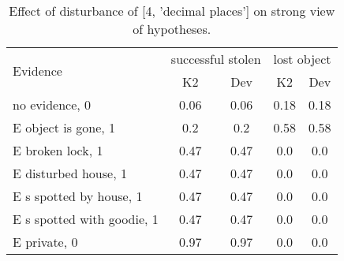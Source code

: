 \begin{table}\begin{tabular}{l|cc|cc}\toprule\multirow{2}{*}{Evidence} & \multicolumn{2}{c}{successful stolen}& \multicolumn{2}{c}{lost object}\\& {K2} & {Dev}& {K2} & {Dev}\\\midrule
no evidence, 0 & 0.06&0.06&0.18&0.18\\E object is gone, 1 & 0.2&0.2&0.58&0.58\\E broken lock, 1 & 0.47&0.47&0.0&0.0\\E disturbed house, 1 & 0.47&0.47&0.0&0.0\\E s spotted by house, 1 & 0.47&0.47&0.0&0.0\\E s spotted with goodie, 1 & 0.47&0.47&0.0&0.0\\E private, 0 & 0.97&0.97&0.0&0.0\\\bottomrule\end{tabular}\caption{Effect of disturbance of [4, 'decimal places'] on strong view of hypotheses.}\end{table}